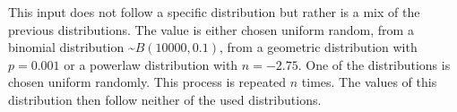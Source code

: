 This input does not follow a specific distribution but rather is a mix of the previous distributions.
The value is either chosen uniform random, from a binomial distribution \textasciitilde$B(10000, 0.1)$, from a geometric distribution with $p=0.001$ or a powerlaw distribution with $n=-2.75$.
One of the distributions is chosen uniform randomly.
This process is repeated $n$ times.
The values of this distribution then follow neither of the used distributions.
